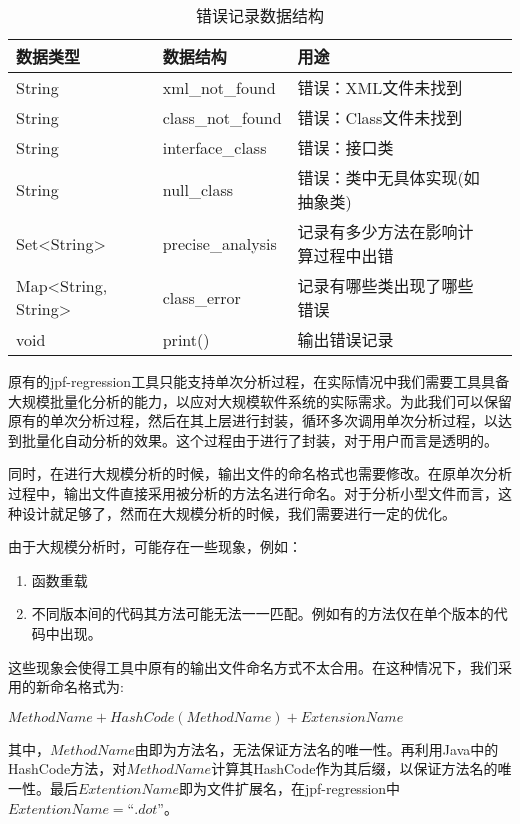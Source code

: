 \begin{table}
	\caption{错误记录数据结构}
	\label{error_data}
	\centering
	\begin{tabular}{lllc}
		\toprule[1.5pt]
		{\heiti 数据类型} &{\heiti 数据结构} & {\heiti 用途} \\\midrule[1pt]
		String & xml\_not\_found & 错误：XML文件未找到 \\
		String & class\_not\_found & 错误：Class文件未找到 \\
		String & interface\_class &  错误：接口类\\
		String & null\_class & 错误：类中无具体实现(如抽象类)\\
		Set<String> & precise\_analysis & 记录有多少方法在影响计算过程中出错\\
		Map<String, String> & class\_error & 记录有哪些类出现了哪些错误\\
		void & print() & 输出错误记录\\
		\bottomrule[1.5pt]
	\end{tabular}
\end{table}



原有的jpf-regression工具只能支持单次分析过程，在实际情况中我们需要工具具备大规模批量化分析的能力，以应对大规模软件系统的实际需求。为此我们可以保留原有的单次分析过程，然后在其上层进行封装，循环多次调用单次分析过程，以达到批量化自动分析的效果。这个过程由于进行了封装，对于用户而言是透明的。

同时，在进行大规模分析的时候，输出文件的命名格式也需要修改。在原单次分析过程中，输出文件直接采用被分析的方法名进行命名。对于分析小型文件而言，这种设计就足够了，然而在大规模分析的时候，我们需要进行一定的优化。

由于大规模分析时，可能存在一些现象，例如：
\begin{enumerate}
	\item 函数重载
	\item 不同版本间的代码其方法可能无法一一匹配。例如有的方法仅在单个版本的代码中出现。
\end{enumerate}

这些现象会使得工具中原有的输出文件命名方式不太合用。在这种情况下，我们采用的新命名格式为:

$MethodName+HashCode(MethodName)+ExtensionName$

其中，$MethodName$由即为方法名，无法保证方法名的唯一性。再利用Java中的HashCode方法，对$MethodName$计算其HashCode作为其后缀，以保证方法名的唯一性。最后$ExtentionName$即为文件扩展名，在jpf-regression中$ExtentionName = “.dot”$。

